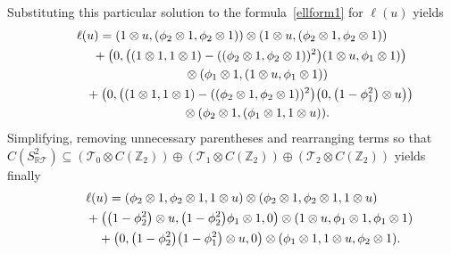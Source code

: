 \documentclass[pdftex]{sigma}
\begin{document}
Substituting this particular solution to the formula~\eqref{ellform1} for $\ell(u)$ yields
\begin{gather*}
\ell(u) =(1\otimes u,(\phi_2\otimes1,\phi_2\otimes 1))\otimes(1\otimes u,(\phi_2\otimes1,\phi_2\otimes 1))
\nonumber
\\
\hphantom{\ell(u) =}
{}+\big(0,\big((1\otimes1,1\otimes 1)-((\phi_2\otimes1,\phi_2\otimes 1))^2\big)(1\otimes u,\phi_1\otimes 1) \big)
\nonumber
\\
\hphantom{\ell(u) =+}{}
\otimes (\phi_1\otimes1,(1\otimes u,\phi_1\otimes 1) )
\nonumber
\\
\hphantom{\ell(u) =}
{}+\big(0, \big((1\otimes1,1\otimes 1)-((\phi_2\otimes1,\phi_2\otimes 1))^2\big)\big(0,\big(1-\phi_1^2\big)\otimes u\big) \big)
\nonumber
\\
\hphantom{\ell(u) =+}{}
\otimes (\phi_2\otimes1,(\phi_1\otimes1,1\otimes u)  ).
\end{gather*}
Simplifying, removing unnecessary parentheses and rearranging terms so that
${C(S^2_{\mathbb{R}\mathcal{T}})}\subseteq({\mathcal{T}}_0\otimes C({\mathbb Z_2}))\oplus ({\mathcal{T}}_1\otimes
C({\mathbb Z_2}))\oplus ({\mathcal{T}}_2\otimes C({\mathbb Z_2}))$ yields f\/inally
\begin{gather}
\ell(u) =(\phi_2\otimes1,\phi_2\otimes1,1\otimes u)\otimes(\phi_2\otimes1,\phi_2\otimes1,1\otimes u)
\nonumber
\\
\hphantom{\ell(u) =}
{}+ \big(\big(1-\phi_2^2\big)\otimes u,\big(1-\phi_2^2\big)\phi_1\otimes1,0\big) \otimes(1\otimes u,\phi_1\otimes1,\phi_1\otimes 1)
\nonumber
\\
\hphantom{\ell(u) =}
{}+ \big(0,\big(1-\phi_2^2\big)\big(1-\phi_1^2\big)\otimes u,0\big) \otimes(\phi_1\otimes1,1\otimes u,\phi_2\otimes 1).
\label{ellform3}
\end{gather}
\end{document}
